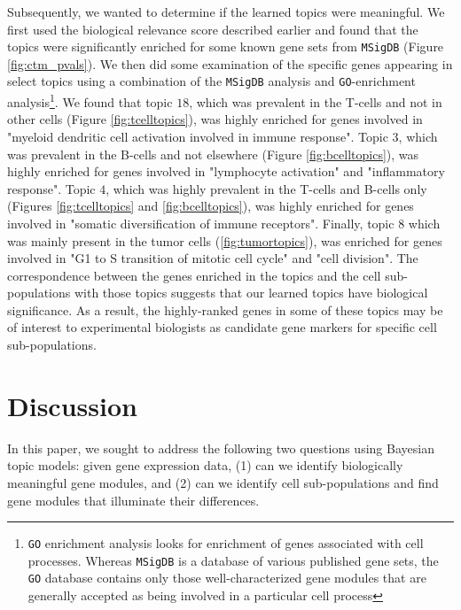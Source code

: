 \documentclass{article}
\begin{document}
Subsequently, we wanted to determine if the learned topics were meaningful. We first used the biological relevance score described earlier and found that the topics were significantly enriched for some known gene sets from \texttt{MSigDB} (Figure \ref{fig:ctm_pvals}). We then did some examination of the specific genes appearing in select topics using a combination of the \texttt{MSigDB} analysis and \texttt{GO}-enrichment analysis\footnote{\texttt{GO} enrichment analysis looks for enrichment of genes associated with cell processes. Whereas \texttt{MSigDB} is a database of various published gene sets, the \texttt{GO} database contains only those well-characterized gene modules that are generally accepted as being involved in a particular cell process}. We found that topic $18$, which was prevalent in the T-cells and not in other cells (Figure \ref{fig:tcelltopics}), was highly enriched for genes involved in "myeloid dendritic cell activation involved in immune response". Topic $3$, which was prevalent in the B-cells and not elsewhere (Figure \ref{fig:bcelltopics}), was highly enriched for genes involved in "lymphocyte activation" and "inflammatory response". Topic $4$, which was highly prevalent in the T-cells and B-cells only (Figures \ref{fig:tcelltopics} and \ref{fig:bcelltopics}), was highly enriched for genes involved in "somatic diversification of immune receptors". Finally, topic $8$ which was mainly present in the tumor cells (\ref{fig:tumortopics}), was enriched for genes involved in "G1 to S transition of mitotic cell cycle" and "cell division". The correspondence between the genes enriched in the topics and the cell sub-populations with those topics suggests that our learned topics have biological significance. As a result, the highly-ranked genes in some of these topics may be of interest to experimental biologists as candidate gene markers for specific cell sub-populations.

\section{Discussion} 

In this paper, we sought to address the following two questions using Bayesian topic models: given gene expression data, (1) can we identify biologically meaningful gene modules, and (2) can we identify cell sub-populations and find gene modules that illuminate their differences. \\
\end{document}
